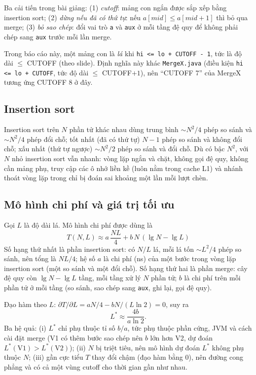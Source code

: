 \documentclass[11pt,a4paper]{article}
\begin{document}
Ba cải tiến trong bài giảng:
(1) \emph{cutoff}: mảng con ngắn được sắp xếp bằng insertion sort;
(2) \emph{dừng nếu đã có thứ tự}: nếu $a[mid] \le a[mid+1]$ thì bỏ qua merge;
(3) \emph{bỏ sao chép}: đổi vai trò \texttt{a} và \texttt{aux} ở mỗi tầng đệ quy để không phải chép
sang \texttt{aux} trước mỗi lần merge.

Trong báo cáo này, một mảng con là \emph{lá} khi \texttt{hi <= lo + CUTOFF - 1}, tức là độ dài
$\le$ CUTOFF (theo slide). Định nghĩa này khác \texttt{MergeX.java} (điều kiện \texttt{hi <= lo + CUTOFF},
tức độ dài $\le$ CUTOFF$+1$), nên ``CUTOFF 7'' của MergeX tương ứng CUTOFF 8 ở đây.

\subsection{Insertion sort}
Insertion sort trên $N$ phần tử khác nhau dùng trung bình $\sim N^2/4$ phép so sánh và $\sim N^2/4$
phép đổi chỗ; tốt nhất (đã có thứ tự) $N-1$ phép so sánh và không đổi chỗ; xấu nhất (thứ tự ngược)
$\sim N^2/2$ phép so sánh và đổi chỗ. Dù có bậc $N^2$, với $N$ nhỏ insertion sort vẫn nhanh:
vòng lặp ngắn và chặt, không gọi đệ quy, không cần mảng phụ, truy cập các ô nhớ liền kề
(luôn nằm trong cache L1) và nhánh thoát vòng lặp trong chỉ bị đoán sai khoảng một lần mỗi lượt chèn.

\subsection{Mô hình chi phí và giá trị tối ưu}
Gọi $L$ là độ dài lá. Mô hình chi phí được dùng là
\begin{equation}
T(N, L) \approx a\,\frac{N L}{4} + b\,N\,(\lg N - \lg L)
\label{eq:model}
\end{equation}
Số hạng thứ nhất là phần insertion sort: có $N/L$ lá, mỗi lá tốn $\sim L^2/4$ phép so sánh, nên tổng là
$NL/4$; hệ số $a$ là chi phí (ns) của một bước trong vòng lặp insertion sort (một so sánh và một đổi chỗ).
Số hạng thứ hai là phần merge: cây đệ quy còn $\lg N - \lg L$ tầng, mỗi tầng xử lý $N$ phần tử;
$b$ là chi phí trên mỗi phần tử ở mỗi tầng (so sánh, sao chép sang \texttt{aux}, ghi lại, gọi đệ quy).

Đạo hàm theo $L$: $\partial T/\partial L = aN/4 - bN/(L\ln 2) = 0$, suy ra
\begin{equation}
L^* \approx \frac{4b}{a\ln 2}.
\end{equation}
Ba hệ quả:
(i) $L^*$ chỉ phụ thuộc tỉ số $b/a$, tức phụ thuộc phần cứng, JVM và cách cài đặt merge (V1 có thêm bước
sao chép nên $b$ lớn hơn V2, dự đoán $L^*(\mathrm{V1}) > L^*(\mathrm{V2})$);
(ii) $N$ bị triệt tiêu, nên mô hình dự đoán $L^*$ không phụ thuộc $N$;
(iii) gần cực tiểu $T$ thay đổi chậm (đạo hàm bằng 0), nên đường cong phẳng và có cả một vùng
cutoff cho thời gian gần như nhau.
\end{document}
